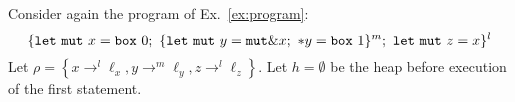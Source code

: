 \begin{example}
  Consider again the program of Ex.~\ref{ex:program}:
  \[
    \{
      \mathtt{let\ mut}\ x = \mathtt{box}\ 0;\
      \{\mathtt{let\ mut}\ y = \mathtt{mut}\& x;\
      \mathtt{*}y = \mathtt{box}\ 1\}^m;\
      \mathtt{let\ mut}\ z = x
    \}^l
  \]
  Let $\rho=\left\{x\rightarrow^l\ell_x,
  y\rightarrow^m\ell_y,
  z\rightarrow^l\ell_z\right\}$.
  Let $h=\emptyset$ be the heap before execution of the first statement.
\end{example}
